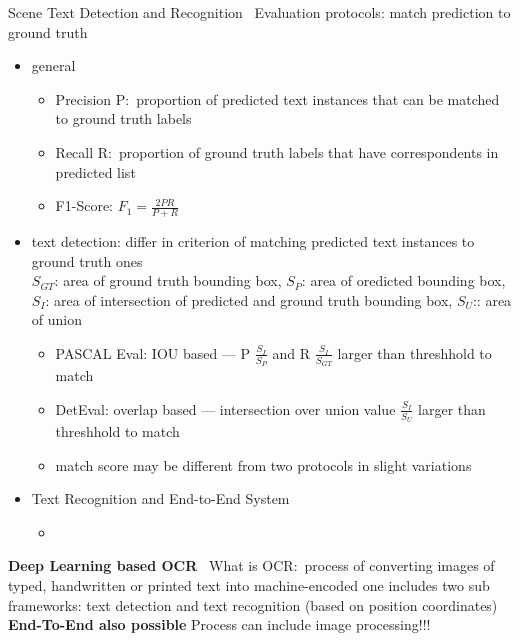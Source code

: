 Scene Text Detection and Recognition~\cite{long_scene_2021}
Evaluation protocols: match prediction to ground truth
\begin{itemize}
    \item general
        \begin{itemize}
            \item Precision P:\ proportion of predicted text instances that can be matched to ground
                truth labels
            \item Recall R:\ proportion of ground truth labels that have correspondents in predicted list
            \item F1-Score: $F_1=\frac{2PR}{P+R}$
        \end{itemize}
    \item text detection: differ in criterion of matching predicted text instances to ground truth ones\\
        $S_{GT}$: area of ground truth bounding box, $S_P$: area of oredicted bounding box,
        $S_I$: area of intersection of predicted and ground truth bounding box, $S_U$:: area of union
        \begin{itemize}
            \item PASCAL Eval: IOU based --- P $\frac{S_I}{S_P}$ and R $\frac{S_I}{S_{GT}}$ larger
                than threshhold to match
            \item DetEval: overlap based --- intersection over union value $\frac{S_I}{S_U}$
                larger than threshhold to match
            \item match score may be different from two protocols in slight variations
        \end{itemize}
    \item Text Recognition and End-to-End System
        \begin{itemize}
            \item %
        \end{itemize}
\end{itemize}

\textbf{Deep Learning based OCR}~\citep{zhao_improving_2020}
What is OCR:\ process of converting images of typed, handwritten or printed text into machine-encoded one
includes two sub frameworks: text detection and text recognition (based on position coordinates)
\textbf{End-To-End also possible}
Process can include image processing!!!

